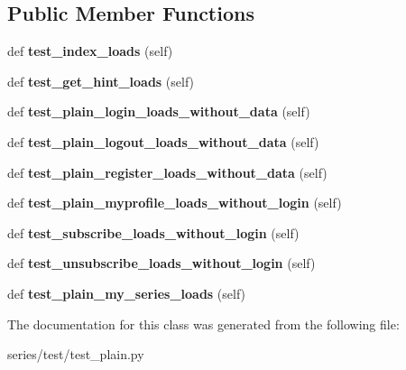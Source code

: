 \subsection*{Public Member Functions}
\begin{DoxyCompactItemize}
\item 
\mbox{\label{classseries_1_1test_1_1test__plain_1_1_plain_test_a62e26f6c6daa4aceebc62cc7c2d01576}} 
def {\bfseries test\+\_\+index\+\_\+loads} (self)
\item 
\mbox{\label{classseries_1_1test_1_1test__plain_1_1_plain_test_a16ab15694c083e0ff7d1921427820996}} 
def {\bfseries test\+\_\+get\+\_\+hint\+\_\+loads} (self)
\item 
\mbox{\label{classseries_1_1test_1_1test__plain_1_1_plain_test_a55b23a7ea0322ac62a6463b083726556}} 
def {\bfseries test\+\_\+plain\+\_\+login\+\_\+loads\+\_\+without\+\_\+data} (self)
\item 
\mbox{\label{classseries_1_1test_1_1test__plain_1_1_plain_test_a028b3f42d33748c09c5096f0611ea739}} 
def {\bfseries test\+\_\+plain\+\_\+logout\+\_\+loads\+\_\+without\+\_\+data} (self)
\item 
\mbox{\label{classseries_1_1test_1_1test__plain_1_1_plain_test_a12d30cefdb737321c711c557872c9c30}} 
def {\bfseries test\+\_\+plain\+\_\+register\+\_\+loads\+\_\+without\+\_\+data} (self)
\item 
\mbox{\label{classseries_1_1test_1_1test__plain_1_1_plain_test_a5b3b685b610a78c8124fdbec0bc7c962}} 
def {\bfseries test\+\_\+plain\+\_\+myprofile\+\_\+loads\+\_\+without\+\_\+login} (self)
\item 
\mbox{\label{classseries_1_1test_1_1test__plain_1_1_plain_test_a9fa462ebbe6cbeae3f588720e273bd89}} 
def {\bfseries test\+\_\+subscribe\+\_\+loads\+\_\+without\+\_\+login} (self)
\item 
\mbox{\label{classseries_1_1test_1_1test__plain_1_1_plain_test_aada672d23b8d93fb4bf58c78f66fc630}} 
def {\bfseries test\+\_\+unsubscribe\+\_\+loads\+\_\+without\+\_\+login} (self)
\item 
\mbox{\label{classseries_1_1test_1_1test__plain_1_1_plain_test_a9eae7138b3825add7f8dd77d3569d64d}} 
def {\bfseries test\+\_\+plain\+\_\+my\+\_\+series\+\_\+loads} (self)
\end{DoxyCompactItemize}


The documentation for this class was generated from the following file\+:\begin{DoxyCompactItemize}
\item 
series/test/test\+\_\+plain.\+py\end{DoxyCompactItemize}
